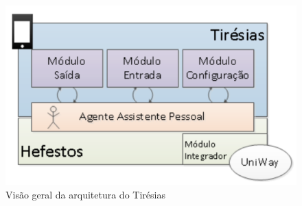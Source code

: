 \documentclass[english,brazilian]{UNISINOSmonografia}
\begin{document}
\begin{figure}[!ht]
	\caption{Visão geral da arquitetura do Tirésias}
	\label{fig:visaoGeralTiresias}
	\centering%
	\begin{minipage}{.6\textwidth}
		\includegraphics[width=\textwidth]{imgs/tiresiasArquitetura}
		\end{minipage}
\end{figure}
\end{document}
